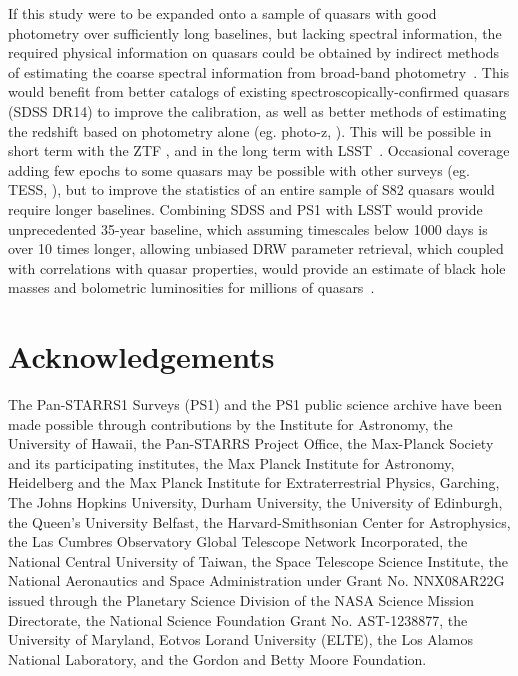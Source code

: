 \documentclass[twocolumn]{aastex62}
\begin{document}
If this study were to be expanded onto a sample of quasars with good photometry over sufficiently long baselines, but lacking spectral information, the required physical information on quasars could be obtained by indirect methods of estimating the coarse spectral information from broad-band photometry~\citep{kozlowski2015}. This would benefit from better catalogs of existing spectroscopically-confirmed quasars (SDSS DR14) to improve the calibration, as well as better methods of estimating the redshift based on photometry alone (eg. photo-z, \citealt{jin2019,curran2019,yang2017,richards2015}).  This will be possible in short term with the ZTF \citep{bellm2018}, and in the long term with LSST~\citep{ivezic2019}. Occasional coverage adding few epochs to some quasars may be possible with other surveys (eg. TESS, \citealt{ricker2014}), but to improve the statistics of an entire sample of S82 quasars would require longer baselines. Combining SDSS and PS1 with LSST would provide unprecedented 35-year baseline, which assuming timescales below 1000 days is over 10 times longer, allowing unbiased DRW parameter retrieval, which coupled with correlations with quasar properties, would provide an estimate of black hole masses and bolometric luminosities for millions of quasars~\citep{ivezic2019}. 


\section{Acknowledgements}

The Pan-STARRS1 Surveys (PS1) and the PS1 public science archive have been made possible through contributions by the Institute for Astronomy, the University of Hawaii, the Pan-STARRS Project Office, the Max-Planck Society and its participating institutes, the Max Planck Institute for Astronomy, Heidelberg and the Max Planck Institute for Extraterrestrial Physics, Garching, The Johns Hopkins University, Durham University, the University of Edinburgh, the Queen's University Belfast, the Harvard-Smithsonian Center for Astrophysics, the Las Cumbres Observatory Global Telescope Network Incorporated, the National Central University of Taiwan, the Space Telescope Science Institute, the National Aeronautics and Space Administration under Grant No. NNX08AR22G issued through the Planetary Science Division of the NASA Science Mission Directorate, the National Science Foundation Grant No. AST-1238877, the University of Maryland, Eotvos Lorand University (ELTE), the Los Alamos National Laboratory, and the Gordon and Betty Moore Foundation.
\end{document}
